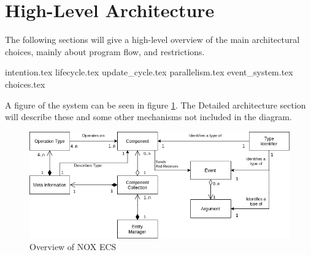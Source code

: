 \section{High-Level Architecture}
The following sections will give a high-level overview of the main architectural
choices, mainly about program flow, and restrictions. 

{intention.tex}
{lifecycle.tex}
{update_cycle.tex}
{parallelism.tex}
{event_system.tex}
{choices.tex}

A figure of the system can be seen in figure \ref{fig:nox_ecs_uml}.
The Detailed architecture section will describe these and some other mechanisms not included in the diagram.

\begin{figure}[tbp]
    \begin{center}
    \includegraphics[scale=0.45]{images/nox_ecs_uml.png}
    \caption{Overview of NOX ECS}
    \label{fig:nox_ecs_uml}
    \end{center}
\end{figure}
